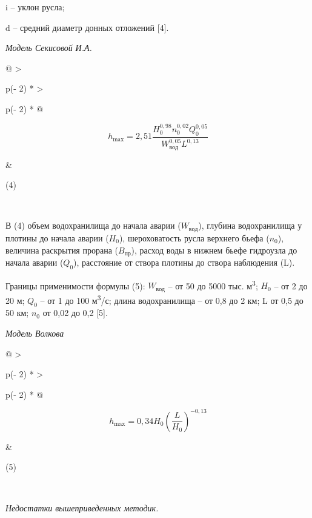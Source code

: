 i -- уклон русла;

d -- средний диаметр донных отложений {[}4{]}.

\emph{Модель Секисовой} \emph{И.А.}

\begin{longtable}[]{@{}
  >{\raggedright\arraybackslash}p{(\columnwidth - 2\tabcolsep) * }
  >{\raggedright\arraybackslash}p{(\columnwidth - 2\tabcolsep) * }@{}}
\toprule\noalign{}
\begin{minipage}[b]{\linewidth}\raggedright
\[h_{\max} = 2,51\frac{H_{0}^{0,98}n_{0}^{0,02}Q_{0}^{0,05}}{W_{вод}^{0,05}L^{0,13}}\]
\end{minipage} & \begin{minipage}[b]{\linewidth}\raggedright
(4)
\end{minipage} \\
\midrule\noalign{}
\endhead
\bottomrule\noalign{}
\endlastfoot
\end{longtable}

В (4) объем водохранилища до начала аварии (\(W_{вод}\)), глубина
водохранилища у плотины до начала аварии (\(H_{0}\)), шероховатость
русла верхнего бьефа (\(n_{0}\)), величина раскрытия прорана
(\(B_{пр}\)), расход воды в нижнем бьефе гидроузла до начала аварии
(\(Q_{0}\)), расстояние от створа плотины до створа наблюдения (L).

Границы применимости формулы (5): \(W_{вод}\) -- от 50 до 5000 тыс.
м\textsuperscript{3}; \(H_{0}\) -- от 2 до 20 м; \(Q_{0}\) -- от 1 до
100 м\textsuperscript{3}/с; длина водохранилища -- от 0,8 до 2 км; L от
0,5 до 50 км; \(n_{0}\) от 0,02 до 0,2 {[}5{]}.

\emph{Модель Волкова}

\begin{longtable}[]{@{}
  >{\raggedright\arraybackslash}p{(\columnwidth - 2\tabcolsep) * }
  >{\raggedright\arraybackslash}p{(\columnwidth - 2\tabcolsep) * }@{}}
\toprule\noalign{}
\begin{minipage}[b]{\linewidth}\raggedright
\[h_{\max} = 0,34H_{0}\left( \frac{L}{H_{0}} \right)^{- 0,13}\]
\end{minipage} & \begin{minipage}[b]{\linewidth}\raggedright
(5)
\end{minipage} \\
\midrule\noalign{}
\endhead
\bottomrule\noalign{}
\endlastfoot
\end{longtable}

\emph{Недостатки вышеприведенных методик.}

